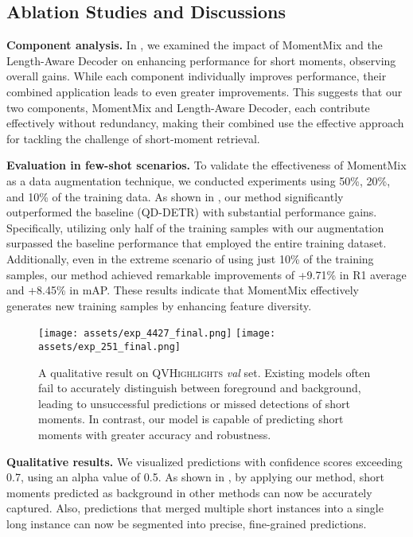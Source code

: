 \subsection{Ablation Studies and Discussions}\label{sec:Ablation studies}

\noindent\textbf{Component analysis.} In , we examined the impact of MomentMix and the Length-Aware Decoder on enhancing performance for short moments, observing overall gains.
While each component individually improves performance, their combined application leads to even greater improvements.
This suggests that our two components, MomentMix and Length-Aware Decoder, each contribute effectively without redundancy, making their combined use the effective approach for tackling the challenge of short-moment retrieval.

\vspace{1mm}
\noindent\textbf{Evaluation in few-shot scenarios.} To validate the effectiveness of MomentMix as a data augmentation technique, we conducted experiments using 50\%, 20\%, and 10\% of the training data.
As shown in , our method significantly outperformed the baseline (QD-DETR) with substantial performance gains. Specifically, utilizing only half of the training samples with our augmentation surpassed the baseline performance that employed the entire training dataset. Additionally, even in the extreme scenario of using just 10\% of the training samples, our method achieved remarkable improvements of +9.71\% in R1 average and +8.45\% in mAP. These results indicate that MomentMix effectively generates new training samples by enhancing feature diversity.

\begin{figure}[t]
    \centering
    \texttt{[image: assets/exp\_4427\_final.png]}
    \texttt{[image: assets/exp\_251\_final.png]}
    \caption{
        A qualitative result on \textsc{QVHighlights} \textit{val} set. Existing models often fail to accurately distinguish between foreground and background, leading to unsuccessful predictions or missed detections of short moments. In contrast, our model is capable of predicting short moments with greater accuracy and robustness. 
    }
    \label{fig:exp_qualitative}
\end{figure}

\vspace{1mm}
\noindent\textbf{Qualitative results.} We visualized predictions with confidence scores exceeding 0.7, using an alpha value of 0.5. As shown in , by applying our method, short moments predicted as background in other methods can now be accurately captured. Also, predictions that merged multiple short instances into a single long instance can now be segmented into precise, fine-grained predictions.

